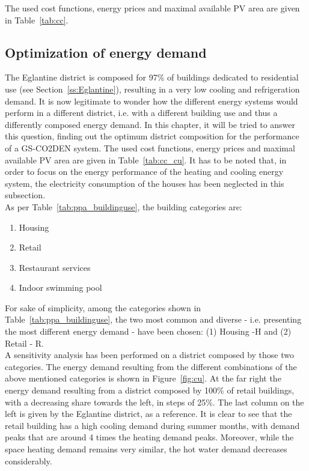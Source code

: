 \documentclass{article}
\begin{document}
The used cost functions, energy prices and maximal available PV area are given in Table~\ref{tab:cc}.


\subsection{Optimization of energy demand}

The Eglantine district is composed for 97\% of buildings dedicated to residential use (see Section~\ref{ss:Eglantine}), resulting in a very low cooling and refrigeration demand. It is now legitimate to wonder how the different energy systems would perform in a different district, i.e. with a different building use and thus a differently composed energy demand. In this chapter, it will be tried to answer this question, finding out the optimum district composition for the performance of a GS-CO2DEN system. The used cost functions, energy prices and maximal available PV area are given in Table~\ref{tab:cc_cu}. It has to be noted that, in order to focus on the energy performance of the heating and cooling energy system, the electricity consumption of the houses has been neglected in this subsection.\\ 



As per Table~\ref{tab:ppa_buildinguse}, the building categories are:
\begin{enumerate}
	\item Housing
	\item Retail
	\item Restaurant services
	\item Indoor swimming pool
\end{enumerate}
For sake of simplicity, among the categories shown in Table~\ref{tab:ppa_buildinguse}, the two most common and diverse - i.e. presenting the most different energy demand - have been chosen: (1) Housing -H and (2) Retail - R. \\

A sensitivity analysis has been performed on a district composed by those two categories. The energy demand resulting from the different combinations of the above mentioned categories is shown in Figure~\ref{fig:cu}. At the far right the energy demand resulting from a district composed by 100\% of retail buildings, with a decreasing share towards the left, in steps of 25\%. The last column on the left is given by the Eglantine district, as a reference. It is clear to see that the retail building has a high cooling demand during summer months, with demand peaks that are around 4 times the heating demand peaks. Moreover, while the space heating demand remains very similar, the hot water demand decreases considerably.
\end{document}
